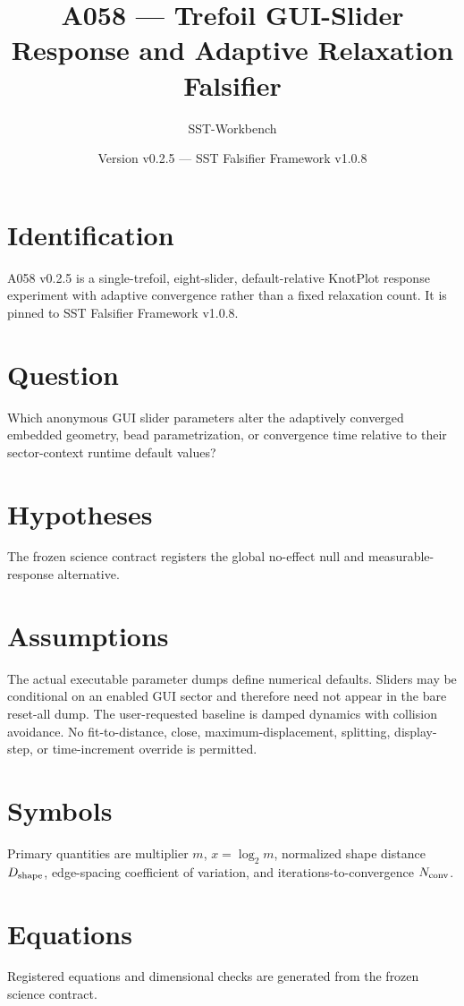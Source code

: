 \documentclass[11pt,a4paper]{article}
\begin{document}
\title{A058 --- Trefoil GUI-Slider Response and Adaptive Relaxation Falsifier}
\author{SST-Workbench}\date{Version v0.2.5 --- SST Falsifier Framework v1.0.8}\maketitle
{}
\section{Identification}
A058 v0.2.5 is a single-trefoil, eight-slider, default-relative KnotPlot response experiment with adaptive convergence rather than a fixed relaxation count. It is pinned to SST Falsifier Framework v1.0.8.
\section{Question}
Which anonymous GUI slider parameters alter the adaptively converged embedded geometry, bead parametrization, or convergence time relative to their sector-context runtime default values?
\section{Hypotheses}
The frozen science contract registers the global no-effect null and measurable-response alternative.
\section{Assumptions}
The actual executable parameter dumps define numerical defaults. Sliders may be conditional on an enabled GUI sector and therefore need not appear in the bare reset-all dump. The user-requested baseline is damped dynamics with collision avoidance. No fit-to-distance, close, maximum-displacement, splitting, display-step, or time-increment override is permitted.
\section{Symbols}
Primary quantities are multiplier $m$, $x=\log_2m$, normalized shape distance $D_{\rm shape}$, edge-spacing coefficient of variation, and iterations-to-convergence $N_{\rm conv}$.
\section{Equations}
Registered equations and dimensional checks are generated from the frozen science contract.
\end{document}
